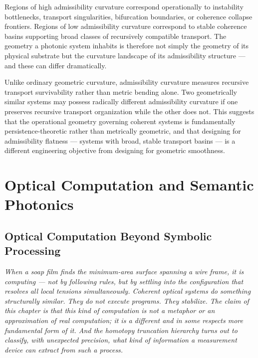 \documentclass[11pt,openany]{book}
\theoremstyle{definition}
\theoremstyle{plain}
\begin{document}
Regions of high admissibility curvature correspond operationally to instability bottlenecks, transport singularities, bifurcation boundaries, or coherence collapse frontiers. Regions of low admissibility curvature correspond to stable coherence basins supporting broad classes of recursively compatible transport. The geometry a photonic system inhabits is therefore not simply the geometry of its physical substrate but the curvature landscape of its admissibility structure --- and these can differ dramatically.

Unlike ordinary geometric curvature, admissibility curvature measures recursive transport survivability rather than metric bending alone. Two geometrically similar systems may possess radically different admissibility curvature if one preserves recursive transport organization while the other does not. This suggests that the operational geometry governing coherent systems is fundamentally persistence-theoretic rather than metrically geometric, and that designing for admissibility flatness --- systems with broad, stable transport basins --- is a different engineering objective from designing for geometric smoothness.


\part{Optical Computation and Semantic Photonics}


\chapter{Optical Computation Beyond Symbolic Processing}

\noindent\textit{When a soap film finds the minimum-area surface spanning a wire frame, it is computing --- not by following rules, but by settling into the configuration that resolves all local tensions simultaneously. Coherent optical systems do something structurally similar. They do not execute programs. They stabilize. The claim of this chapter is that this kind of computation is not a metaphor or an approximation of real computation; it is a different and in some respects more fundamental form of it. And the homotopy truncation hierarchy turns out to classify, with unexpected precision, what kind of information a measurement device can extract from such a process.}
\end{document}
